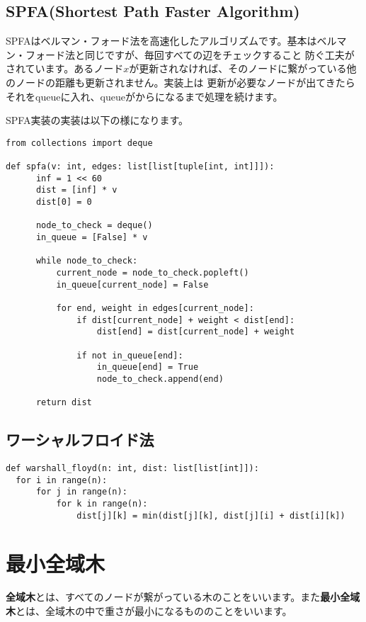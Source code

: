 \documentclass{jlreq}
\begin{document}
\newpage

\subsection{SPFA(Shortest Path Faster Algorithm)}
SPFAはベルマン・フォード法を高速化したアルゴリズムです。基本はベルマン・フォード法と同じですが、毎回すべての辺をチェックすること
防ぐ工夫がされています。あるノード$x$が更新されなければ、そのノードに繋がっている他のノードの距離も更新されません。実装上は
更新が必要なノードが出てきたらそれをqueueに入れ、queueがからになるまで処理を続けます。

SPFA実装の実装は以下の様になります。

\begin{lstlisting}[caption=SPFAの実装, label=spfa, frame=TRBL, label={spfa}]
from collections import deque

def spfa(v: int, edges: list[list[tuple[int, int]]]):
      inf = 1 << 60
      dist = [inf] * v
      dist[0] = 0
      
      node_to_check = deque()
      in_queue = [False] * v
      
      while node_to_check:
          current_node = node_to_check.popleft()
          in_queue[current_node] = False
          
          for end, weight in edges[current_node]:
              if dist[current_node] + weight < dist[end]:
                  dist[end] = dist[current_node] + weight 
              
              if not in_queue[end]:
                  in_queue[end] = True
                  node_to_check.append(end)
      
      return dist
\end{lstlisting}

\newpage

\subsection{ワーシャルフロイド法}
\begin{lstlisting}[caption=ワーシャルフロイド法の実装, label=warshall, frame=TRBL, label={warshall}]
def warshall_floyd(n: int, dist: list[list[int]]):
  for i in range(n):
      for j in range(n):
          for k in range(n):
              dist[j][k] = min(dist[j][k], dist[j][i] + dist[i][k])
\end{lstlisting}


\newpage

\section{最小全域木}
\textbf{全域木}とは、すべてのノードが繋がっている木のことをいいます。また\textbf{最小全域木}とは、全域木の中で重さが最小になるもののことをいいます。
\end{document}
